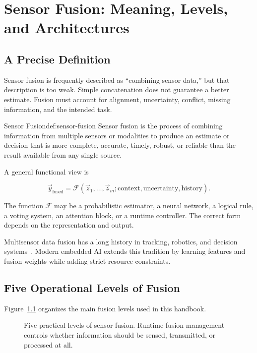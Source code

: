 \chapter{Sensor Fusion: Meaning, Levels, and Architectures}
\label{chap:sensor-fusion}

\section{A Precise Definition}

Sensor fusion is frequently described as ``combining sensor data,'' but that description is too weak. Simple concatenation does not guarantee a better estimate. Fusion must account for alignment, uncertainty, conflict, missing information, and the intended task.

\begin{definition}{Sensor Fusion}{def:sensor-fusion}
Sensor fusion is the process of combining information from multiple sensors or modalities to produce an estimate or decision that is more complete, accurate, timely, robust, or reliable than the result available from any single source.
\end{definition}

A general functional view is

\[
    \vec{y}_{\text{fused}}
    = \mathcal{F}\!\left(
        \vec{z}_1,\ldots,\vec{z}_m;
        \text{context},\text{uncertainty},\text{history}
      \right).
\]

The function \(\mathcal{F}\) may be a probabilistic estimator, a neural network, a logical rule, a voting system, an attention block, or a runtime controller. The correct form depends on the representation and output.

Multisensor data fusion has a long history in tracking, robotics, and decision systems~\cite{hall1997introduction,khaleghi2013multisensor}. Modern embedded AI extends this tradition by learning features and fusion weights while adding strict resource constraints.

\section{Five Operational Levels of Fusion}

Figure~\ref{fig:fusion-levels} organizes the main fusion levels used in this handbook.

\begin{figure}[H]
    \centering
    \resizebox{0.94\textwidth}{!}{}
    \caption{Five practical levels of sensor fusion. Runtime fusion management controls whether information should be sensed, transmitted, or processed at all.}
    \label{fig:fusion-levels}
\end{figure}

